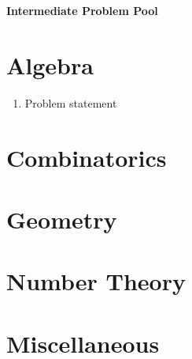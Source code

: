 \documentclass{article}
\begin{document}
\begin{center}
\textbf{\huge Intermediate Problem Pool}
\end{center}

\section*{Algebra}

\begin{enumerate}[1.]

\item %
Problem statement

\end{enumerate}

\section*{Combinatorics}

\section*{Geometry}

\section*{Number Theory}

\section*{Miscellaneous}
\end{document}
